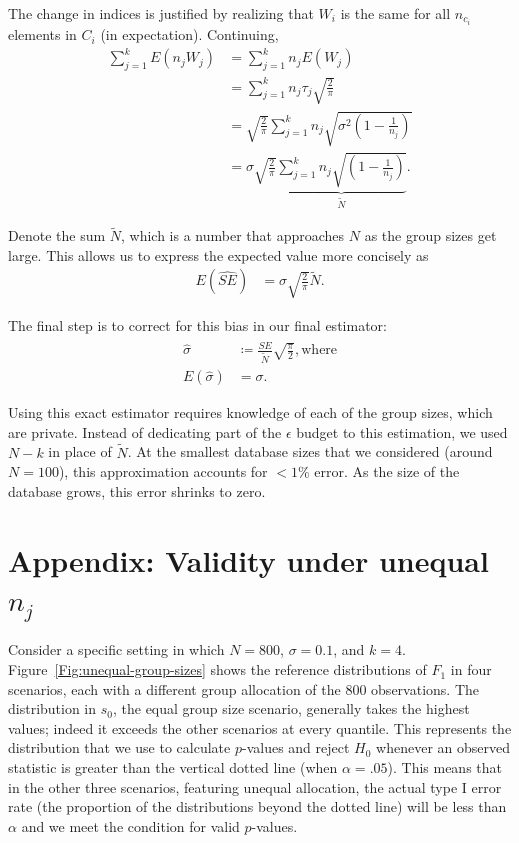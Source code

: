 \documentclass[USenglish,oneside]{article}
\newcounter{ab}
\newcounter{ar}
\newcounter{igh}
\begin{document}
\noindent The change in indices is justified by realizing that $W_i$ is the same for all $n_{c_i}$ elements in $C_i$ (in expectation). Continuing,
\begin{align*}
\sum_{j=1}^k E\left(n_j W_j \right) &= \sum_{j=1}^k n_j E\left(W_j \right) \\
&= \sum_{j=1}^k n_j \tau_j \sqrt{\frac{2}{\pi}} \\
&= \sqrt{\frac{2}{\pi}} \sum_{j=1}^k n_j \sqrt{\sigma^2\left(1 - \frac{1}{n_j}\right)}  \\
&= \sigma \sqrt{\frac{2}{\pi}} \underbrace{\sum_{j=1}^k n_j \sqrt{\left(1 - \frac{1}{n_j}\right)}}_{\tilde{N}}.
\end{align*}

\noindent Denote the sum $\tilde{N}$, which is a number that approaches $N$ as the group sizes get large. This allows us to express the expected value more concisely as
\begin{align*}
E(\widehat{SE}) &= \sigma \sqrt{\frac{2}{\pi}} \tilde{N}.
\end{align*}

The final step is to correct for this bias in our final estimator:
\begin{align*}
\hat{\sigma} &\coloneqq \frac{\widehat{SE}}{\tilde{N}}\sqrt{\frac{\pi}{2}}, \text{where}\\
E\left(\hat{\sigma}\right) &= \sigma.
\end{align*}

\noindent Using this exact estimator requires knowledge of each of the group sizes, which are private. Instead of dedicating part of the $\epsilon$ budget to this estimation, we used $N - k$ in place of $\tilde{N}$. At the smallest database sizes that we considered (around $N = 100$), this approximation accounts for $< 1\%$ error. As the size of the database grows, this error shrinks to zero.



\section{Appendix: Validity under unequal $n_j$}\label{app:unequal}

Consider a specific setting in which $N = 800$, $\sigma = 0.1$, and $k = 4$. Figure~\ref{Fig:unequal-group-sizes} shows the reference distributions of $F_1$ in four scenarios, each with a different group allocation of the 800 observations. The distribution in $s_0$, the equal group size scenario, generally takes the highest values; indeed it exceeds the other scenarios at every quantile. This represents the distribution that we use to calculate $p$-values and reject $H_0$ whenever an observed statistic is greater than the vertical dotted line (when $\alpha = .05$). This means that in the other three scenarios, featuring unequal allocation, the actual type I error rate (the proportion of the distributions beyond the dotted line) will be less than $\alpha$ and we meet the condition for valid $p$-values.
\end{document}
